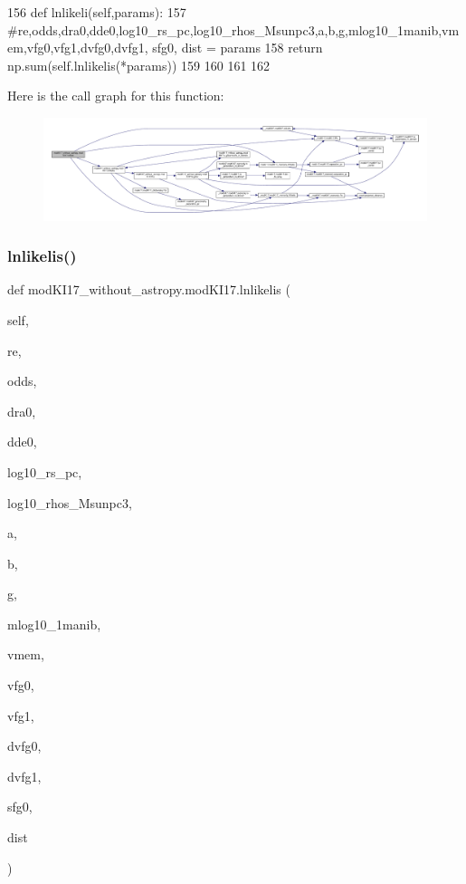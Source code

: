 \begin{DoxyCode}
156     \textcolor{keyword}{def }lnlikeli(self,params):
157         \textcolor{comment}{#re,odds,dra0,dde0,log10\_rs\_pc,log10\_rhos\_Msunpc3,a,b,g,mlog10\_1manib,vmem,vfg0,vfg1,dvfg0,dvfg1,
       sfg0, dist = params}
158         \textcolor{keywordflow}{return} np.sum(self.lnlikelis(*params))
159         
160         
161         
162         
\end{DoxyCode}
Here is the call graph for this function\+:\nopagebreak
\begin{figure}[H]
\begin{center}
\leavevmode
\includegraphics[width=350pt]{d3/df4/classmodKI17__without__astropy_1_1modKI17_aa78ac0827335ae5b100709d37d06e946_cgraph}
\end{center}
\end{figure}
\mbox{\label{classmodKI17__without__astropy_1_1modKI17_ab936b4548a8cece5971ccd63db9bccc5}} 
\subsubsection{\texorpdfstring{lnlikelis()}{lnlikelis()}}
{\footnotesize\ttfamily def mod\+K\+I17\+\_\+without\+\_\+astropy.\+mod\+K\+I17.\+lnlikelis (\begin{DoxyParamCaption}\item[{}]{self,  }\item[{}]{re,  }\item[{}]{odds,  }\item[{}]{dra0,  }\item[{}]{dde0,  }\item[{}]{log10\+\_\+rs\+\_\+pc,  }\item[{}]{log10\+\_\+rhos\+\_\+\+Msunpc3,  }\item[{}]{a,  }\item[{}]{b,  }\item[{}]{g,  }\item[{}]{mlog10\+\_\+1manib,  }\item[{}]{vmem,  }\item[{}]{vfg0,  }\item[{}]{vfg1,  }\item[{}]{dvfg0,  }\item[{}]{dvfg1,  }\item[{}]{sfg0,  }\item[{}]{dist }\end{DoxyParamCaption})}



